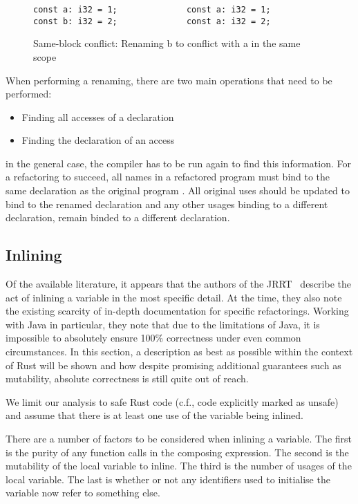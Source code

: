 \begin{figure}[h]
\begin{verbatim}
const a: i32 = 1;              const a: i32 = 1;
const b: i32 = 2;              const a: i32 = 2;
\end{verbatim}
\caption{Same-block conflict: Renaming b to conflict with a in the same scope}
\label{Fig:same}
\end{figure}

When performing a renaming, there are two main operations that need to be performed:
\begin{itemize}
\item Finding all accesses of a declaration
\item Finding the declaration of an access
\end{itemize}

in the general case, the compiler has to be run again to find this information. For a refactoring to succeed, all names in a refactored program must bind to the same declaration as the original program \cite{schafer2010specification}. All original uses should be updated to bind to the renamed declaration and any other usages binding to a different declaration, remain binded to a different declaration.

\subsection{Inlining}

Of the available literature, it appears that the authors of the JRRT~\cite{schafer2010specification} describe the act of inlining a variable in the most specific detail. At the time, they also note the existing scarcity of in-depth documentation for specific refactorings. Working with Java in particular, they note that due to the limitations of Java, it is impossible to absolutely ensure 100\% correctness under even common circumstances. In this section, a description as best as possible within the context of Rust will be shown and how despite promising additional guarantees such as mutability, absolute correctness is still quite out of reach.

We limit our analysis to safe Rust code (c.f., code explicitly marked as unsafe) and assume that there is at least one use of the variable being inlined.

There are a number of factors to be considered when inlining a variable. The first is the purity of any function calls in the composing expression. The second is the mutability of the local variable to inline. The third is the number of usages of the local variable. The last is whether or not any identifiers used to initialise the variable now refer to something else.

